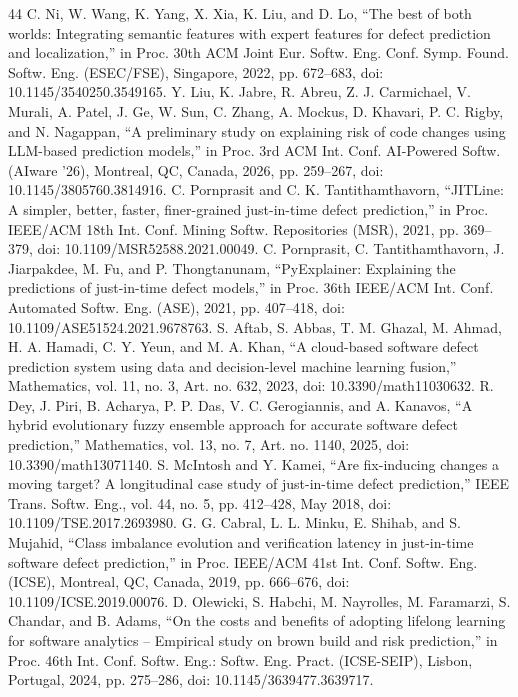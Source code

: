 \begin{thebibliography}{44}
 C. Ni, W. Wang, K. Yang, X. Xia, K. Liu, and D. Lo, ``The best of both worlds: Integrating semantic features with expert features for defect prediction and localization,'' in Proc. 30th ACM Joint Eur. Softw. Eng. Conf. Symp. Found. Softw. Eng. (ESEC/FSE), Singapore, 2022, pp. 672--683, doi: \mbox{10.1145/3540250.3549165}.
 Y. Liu, K. Jabre, R. Abreu, Z. J. Carmichael, V. Murali, A. Patel, J. Ge, W. Sun, C. Zhang, A. Mockus, D. Khavari, P. C. Rigby, and N. Nagappan, ``A preliminary study on explaining risk of code changes using LLM-based prediction models,'' in Proc. 3rd ACM Int. Conf. AI-Powered Softw. (AIware '26), Montreal, QC, Canada, 2026, pp. 259--267, doi: \mbox{10.1145/3805760.3814916}.
 C. Pornprasit and C. K. Tantithamthavorn, ``JITLine: A simpler, better, faster, finer-grained just-in-time defect prediction,'' in Proc. IEEE/ACM 18th Int. Conf. Mining Softw. Repositories (MSR), 2021, pp. 369--379, doi: \mbox{10.1109/MSR52588.2021.00049}.
 C. Pornprasit, C. Tantithamthavorn, J. Jiarpakdee, M. Fu, and P. Thongtanunam, ``PyExplainer: Explaining the predictions of just-in-time defect models,'' in Proc. 36th IEEE/ACM Int. Conf. Automated Softw. Eng. (ASE), 2021, pp. 407--418, doi: \mbox{10.1109/ASE51524.2021.9678763}.
 S. Aftab, S. Abbas, T. M. Ghazal, M. Ahmad, H. A. Hamadi, C. Y. Yeun, and M. A. Khan, ``A cloud-based software defect prediction system using data and decision-level machine learning fusion,'' Mathematics, vol. 11, no. 3, Art. no. 632, 2023, doi: \mbox{10.3390/math11030632}.
 R. Dey, J. Piri, B. Acharya, P. P. Das, V. C. Gerogiannis, and A. Kanavos, ``A hybrid evolutionary fuzzy ensemble approach for accurate software defect prediction,'' Mathematics, vol. 13, no. 7, Art. no. 1140, 2025, doi: \mbox{10.3390/math13071140}.
 S. McIntosh and Y. Kamei, ``Are fix-inducing changes a moving target? A longitudinal case study of just-in-time defect prediction,'' IEEE Trans. Softw. Eng., vol. 44, no. 5, pp. 412--428, May 2018, doi: \mbox{10.1109/TSE.2017.2693980}.
 G. G. Cabral, L. L. Minku, E. Shihab, and S. Mujahid, ``Class imbalance evolution and verification latency in just-in-time software defect prediction,'' in Proc. IEEE/ACM 41st Int. Conf. Softw. Eng. (ICSE), Montreal, QC, Canada, 2019, pp. 666--676, doi: \mbox{10.1109/ICSE.2019.00076}.
 D. Olewicki, S. Habchi, M. Nayrolles, M. Faramarzi, S. Chandar, and B. Adams, ``On the costs and benefits of adopting lifelong learning for software analytics -- Empirical study on brown build and risk prediction,'' in Proc. 46th Int. Conf. Softw. Eng.: Softw. Eng. Pract. (ICSE-SEIP), Lisbon, Portugal, 2024, pp. 275--286, doi: \mbox{10.1145/3639477.3639717}.

\end{thebibliography}
